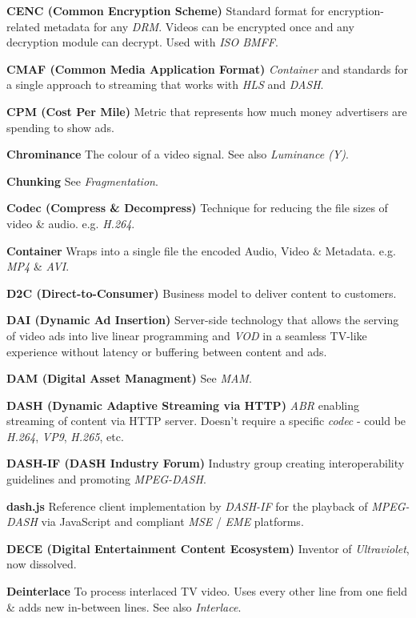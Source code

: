 \smallskip
\textbf{CENC (Common Encryption Scheme)}
Standard format for encryption-related metadata for any \textit{DRM}. Videos can be encrypted once and any decryption module can decrypt.  Used with \textit{ISO BMFF}.

\smallskip
\textbf{CMAF (Common Media Application Format)}
\textit{Container} and standards for a single approach to streaming that works with \textit{HLS} and \textit{DASH}.

\smallskip
\textbf{CPM (Cost Per Mile)}
Metric that represents how much money advertisers are spending to show ads.

\smallskip
\textbf{Chrominance}
The colour of a video signal. See also \textit{Luminance (Y)}.

\smallskip
\textbf{Chunking}
See \textit{Fragmentation}.

\smallskip
\textbf{Codec (Compress \& Decompress)}
Technique for reducing the file sizes of video \& audio. e.g. \textit{H.264}.

\smallskip
\textbf{Container}
Wraps into a single file the encoded Audio, Video \& Metadata.  e.g. \textit{MP4} \& \textit{AVI}.

\smallskip
\textbf{D2C (Direct-to-Consumer)}
Business model to deliver content to customers.

\smallskip
\textbf{DAI (Dynamic Ad Insertion)}
Server-side technology that allows the serving of video ads into live linear programming and \textit{VOD} in a seamless TV-like experience without latency or buffering between content and ads.

\smallskip
\textbf{DAM (Digital Asset Managment)}
See \textit{MAM}.

\smallskip
\textbf{DASH (Dynamic Adaptive Streaming via HTTP)}
\textit{ABR} enabling streaming of content via HTTP server. Doesn't require a specific \textit{codec} - could be \textit{H.264}, \textit{VP9}, \textit{H.265}, etc.

\smallskip
\textbf{DASH-IF (DASH Industry Forum)}
Industry group creating interoperability guidelines and promoting \textit{MPEG-DASH}.

\smallskip
\textbf{dash.js}
Reference client implementation by \textit{DASH-IF} for the playback of \textit{MPEG-DASH} via JavaScript and compliant \textit{MSE} / \textit{EME} platforms.

\smallskip
\textbf{DECE (Digital Entertainment Content Ecosystem)}
Inventor of \textit{Ultraviolet}, now dissolved.

\smallskip
\textbf{Deinterlace}
To process interlaced TV video. Uses every other line from one field \& adds new in-between lines. See also \textit{Interlace}.

